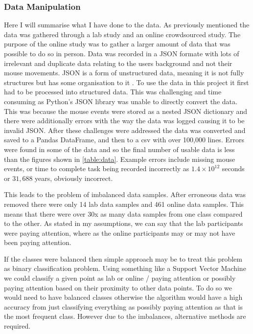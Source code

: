 \documentclass{article}
\begin{document}

\subsubsection{Data Manipulation}

Here I will summarise what I have done to the data.
As previously mentioned the data was gathered through a lab study and an online crowdsourced study.
The purpose of the online study was to gather a larger amount of data that was possible to do so in person.
Data was recorded in a JSON formate with lots of irrelevant and duplicate data relating to the users background and not their mouse movements.
JSON is a form of unstructured data, meaning it is not fully structures but has some organisation to it \cite{ronk2014structured}.
To use the data in this project it first had to be processed into structured data.
This was challenging and time consuming as Python's JSON library was unable to directly convert the data.
This was because the mouse events were stored as a nested JSON dictionary and there were additionally errors with the way the data was logged causing it to be invalid JSON.
After these challenges were addressed the data was converted and saved to a Pandas DataFrame, and then to a csv with over 100,000 lines.
Errors were found in some of the data and so the final number of usable data is less than the figures shown in \ref{table:data}.
Example errors include missing mouse events, or time to complete task being recorded incorrectly as 
$1.4 \times 10^{12}$ seconds or $31,688$ years, obviously incorrect.

This leads to the problem of imbalanced data samples.
After erroneous data was removed there were only 14 lab data samples and 461 online data samples.
This means that there were over 30x as many data samples from one class compared to the other.
As stated in my assumptions, we can say that the lab participants were paying attention, where as the online participants may or may not have been paying attention.

If the classes were balanced then simple approach may be to treat this problem as binary classification problem.
Using something like a Support Vector Machine we could classify a given point as lab or online / paying attention or possibly paying attention based on their proximity to other data points.
To do so we would need to have balanced classes otherwise the algorithm would have a high accuracy from just classifying everything as possibly paying attention as that is the most frequent class.
However due to the imbalances, alternative methods are required.
\end{document}
